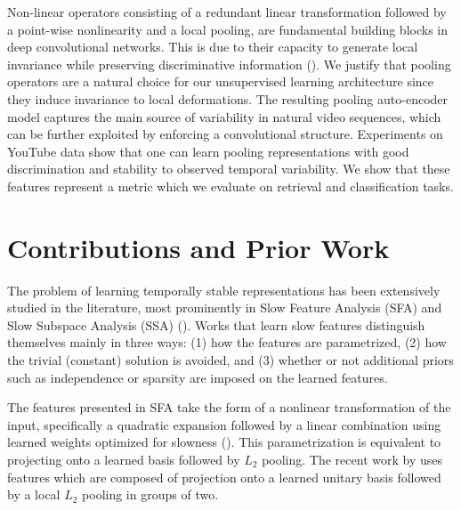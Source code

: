 Non-linear operators consisting of a redundant linear transformation followed
by a point-wise nonlinearity and a local pooling, are fundamental building
blocks in deep convolutional networks. This is due to their capacity to
generate local invariance while preserving discriminative information
(\cite{LeCun1998, JoanScat}). We justify that pooling operators are a natural
choice for our unsupervised learning architecture since they induce invariance
to local deformations. The resulting pooling auto-encoder model captures the
main source of variability in natural video sequences, which can be further
exploited by enforcing a convolutional structure. Experiments on YouTube data
show that one can learn pooling representations with good discrimination and
stability to observed temporal variability. We show that these features
represent a metric which we evaluate on retrieval and classification tasks. 

\section{Contributions and Prior Work} The problem of learning temporally
stable representations has been extensively studied in the literature, most
prominently in Slow Feature Analysis (SFA) and Slow Subspace Analysis (SSA)
(\cite{SFA,SSA,hyvarinen2003bubbles}). Works that learn slow features
distinguish themselves mainly in three ways: (1) how the features are
parametrized, (2) how the trivial (constant) solution is avoided, and (3)
whether or not additional priors such as independence or sparsity are imposed
on the learned features. 

The features presented in SFA take the form of a nonlinear transformation of
the input, specifically a quadratic expansion followed by a linear combination
using learned weights optimized for slowness (\cite{SFA}).  This
parametrization is equivalent to projecting onto a learned basis followed by
$L_2$ pooling. The recent work by \cite{complexCells} uses features which are
composed of projection onto a learned unitary basis followed by a local $L_2$
pooling in groups of two. 


